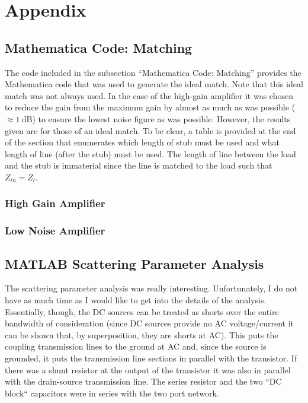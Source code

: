 \section{Appendix}

\subsection{Mathematica Code: Matching}
The code included in the subsection ``Mathematica Code: Matching'' provides the
Mathematica code that was used to generate the ideal match. Note that this ideal
match was not always used. In the case of the high-gain amplifier it was chosen
to reduce the gain from the maximum gain by almost as much as was possible
($\approx \SI{1}{\deci\bel}$) to ensure the lowest noise figure as was possible.
However, the results given are for those of an ideal match. To be clear, a table
is provided at the end of the section that enumerates which length of stub must
be used and what length of line (after the stub) must be used. The length of
line between the load and the stub is immaterial since the line is matched to
the load such that $Z_{in} = Z_l$.

\subsubsection{High Gain Amplifier}



\subsubsection{Low Noise Amplifier}



\subsection{MATLAB Scattering Parameter Analysis}

The scattering parameter analysis was really interesting. Unfortunately, I do
not have as much time as I would like to get into the details of the analysis.
Essentially, though, the DC sources can be treated as shorts over the entire
bandwidth of consideration (since DC sources provide no AC voltage/current it
can be shown that, by superposition, they are shorts at AC). This puts the
coupling transmission lines to the ground at AC and, since the source is
grounded, it puts the transmission line sections in parallel with the
transistor. If there was a shunt resistor at the output of the transistor it was
also in parallel with the drain-source transmission line. The series resistor
and the two ``DC block`` capacitors were in series with the two port network.

